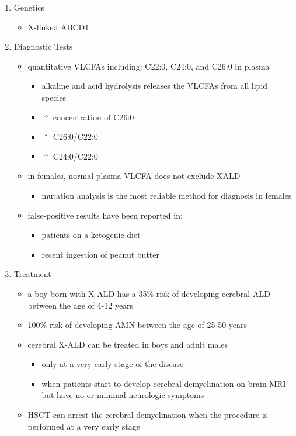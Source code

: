 \documentclass{scrartcl}
\begin{document}
\begin{enumerate}
\item Genetics
\label{sec:org477d2bf}
\begin{itemize}
\item X-linked ABCD1
\end{itemize}

\item Diagnostic Tests
\label{sec:org65ece26}
\begin{itemize}
\item quantitative VLCFAs including: C22:0, C24:0, and C26:0 in plasma
\begin{itemize}
\item alkaline and acid hydrolysis releases the VLCFAs from all lipid
species
\item \(\uparrow\) concentration of C26:0
\item \(\uparrow\) C26:0/C22:0
\item \(\uparrow\) C24:0/C22:0
\end{itemize}

\item in females, normal plasma VLCFA does not exclude XALD
\begin{itemize}
\item mutation analysis is the most reliable method for diagnosis in females
\end{itemize}

\item false-positive results have been reported in:
\begin{itemize}
\item patients on a ketogenic diet
\item recent ingestion of peanut butter
\end{itemize}
\end{itemize}

\item Treatment
\label{sec:org9da3ff1}
\begin{itemize}
\item a boy born with X-ALD has a 35\% risk of developing cerebral ALD
between the age of 4-12 years
\item 100\% risk of developing AMN between the age of 25-50 years
\item cerebral X-ALD can be treated in boys and adult males
\begin{itemize}
\item only at a very early stage of the disease
\item when patients start to develop cerebral demyelination on brain MRI
but have no or minimal neurologic symptoms
\end{itemize}
\item HSCT can arrest the cerebral demyelination when the procedure is
performed at a very early stage
\end{itemize}
\end{enumerate}
\end{document}

